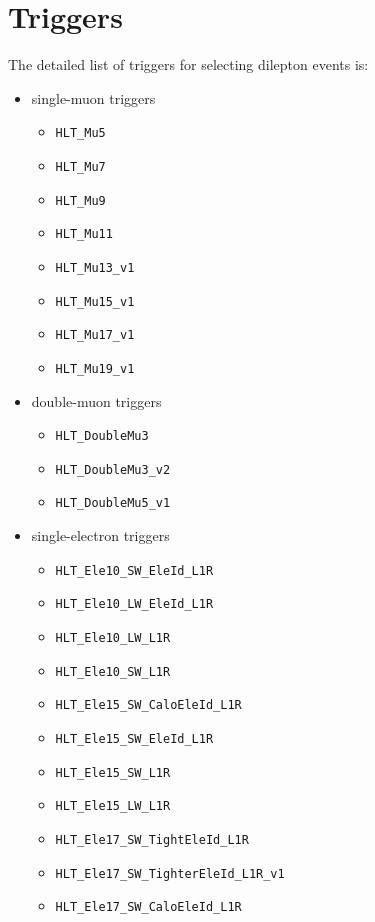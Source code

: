 \section{Triggers}
\label{app:trigsel}

The detailed list of triggers for selecting dilepton events is:
%



\begin{itemize}
\item single-muon triggers
  \begin{itemize}
  \item \verb=HLT_Mu5=
  \item \verb=HLT_Mu7=        
  \item \verb=HLT_Mu9=         
  \item \verb=HLT_Mu11=       
  \item \verb=HLT_Mu13_v1=     
  \item \verb=HLT_Mu15_v1=     
  \item \verb=HLT_Mu17_v1=     
  \item \verb=HLT_Mu19_v1=     
  \end{itemize}
\item double-muon triggers
  \begin{itemize}
  \item \verb=HLT_DoubleMu3=
  \item \verb=HLT_DoubleMu3_v2=
  \item \verb=HLT_DoubleMu5_v1=
  \end{itemize}
\item single-electron triggers
  \begin{itemize}
  \item \verb=HLT_Ele10_SW_EleId_L1R=
  \item \verb=HLT_Ele10_LW_EleId_L1R=
  \item \verb=HLT_Ele10_LW_L1R=
  \item \verb=HLT_Ele10_SW_L1R=
  \item \verb=HLT_Ele15_SW_CaloEleId_L1R=
  \item \verb=HLT_Ele15_SW_EleId_L1R=
  \item \verb=HLT_Ele15_SW_L1R=
  \item \verb=HLT_Ele15_LW_L1R=
  \item \verb=HLT_Ele17_SW_TightEleId_L1R=
  \item \verb=HLT_Ele17_SW_TighterEleId_L1R_v1=
  \item \verb=HLT_Ele17_SW_CaloEleId_L1R=

\end{itemize}
\end{itemize}
